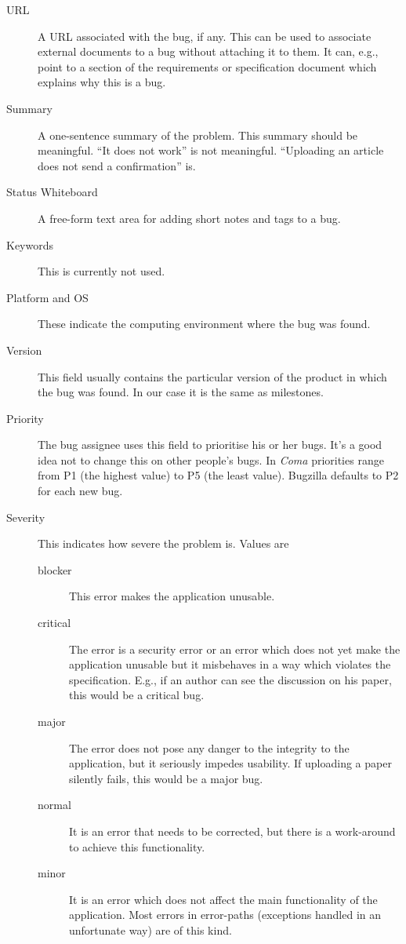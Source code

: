 \documentclass[11pt,nologo,handout]{handout}
\newcommand{\Coma}{\textsl{Coma}}
\begin{document}
\begin{description}
\item[URL] A URL associated with the bug, if any.  This can be used to
  associate external documents to a bug without attaching it to them.
  It can, e.g., point to a section of the requirements or specification
  document which explains why this is a bug.
\item[Summary] A one-sentence summary of the problem.  This summary should
  be meaningful.  ``It does not work'' is not meaningful.  ``Uploading an
  article does not send a confirmation'' is.
\item[Status Whiteboard]  A free-form text area for adding short notes and
  tags to a bug.
\item[Keywords]  This is currently not used.
\item[Platform and OS]  These indicate the computing environment where the
  bug was found.
\item[Version]  This field usually contains the particular version of the
  product in which the bug was found.  In our case it is the same as
  milestones.
\item[Priority]  The bug assignee uses this field to prioritise his or her
  bugs.  It's a good idea not to change this on other people's bugs.  In
  {\Coma} priorities range from P1 (the highest value) to P5 (the least
  value).  Bugzilla defaults to P2 for each new bug.
\item[Severity]  This indicates how severe the problem is.  Values are
  \begin{description}
  \item[blocker]  This error makes the application unusable.
  \item[critical]  The error is a security error or an error which does not
    yet make the application unusable but it misbehaves in a way which
    violates the specification.  E.g., if an author can see the discussion
    on his paper, this would be a critical bug.
  \item[major]  The error does not pose any danger to the integrity to the
    application, but it seriously impedes usability.  If uploading a paper
    silently fails, this would be a major bug.
  \item[normal]  It is an error that needs to be corrected, but there is
    a work-around to achieve this functionality.
  \item[minor]  It is an error which does not affect the main functionality
    of the application.  Most errors in error-paths (exceptions handled in
    an unfortunate way) are of this kind.

\end{description}
\end{description}
\end{document}
